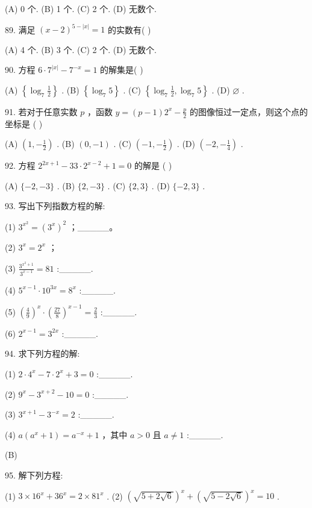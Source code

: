 \documentclass[10pt]{article}
\begin{document}
(A) 0 个. (B) 1 个. (C) 2 个. (D) 无数个.

89. 满足 \({\left( x - 2\right) }^{5 - \left| x\right| } = 1\) 的实数有( )

(A) 4 个. (B) 3 个. (C) 2 个. (D) 无数个.

90. 方程 \(6 \cdot  {7}^{\left| x\right| } - {7}^{-x} = 1\) 的解集是( )

(A) \(\left\{  {{\log }_{7}\frac{1}{2}}\right\}\) . (B) \(\left\{  {{\log }_{7}5}\right\}\) . (C) \(\left\{  {{\log }_{7}\frac{1}{2},{\log }_{7}5}\right\}\) . (D) \(\varnothing\) .

91. 若对于任意实数 \(p\) ，函数 \(y = \left( {p - 1}\right) {2}^{x} - \frac{p}{2}\) 的图像恒过一定点，则这个点的坐标是 ( )

(A) \(\left( {1, - \frac{1}{2}}\right)\) . (B) \(\left( {0, - 1}\right)\) . (C) \(\left( {-1, - \frac{1}{2}}\right)\) . (D) \(\left( {-2, - \frac{1}{4}}\right)\) .

92. 方程 \({2}^{{2x} + 1} - {33} \cdot  {2}^{x - 2} + 1 = 0\) 的解是 ( )

(A) \(\{  - 2, - 3\}\) . (B) \(\{ 2, - 3\}\) . (C) \(\{ 2,3\}\) . (D) \(\{  - 2,3\}\) .

93. 写出下列指数方程的解:

(1) \({3}^{{x}^{2}} = {\left( {3}^{x}\right) }^{2}\) ；\_\_\_\_\_。

(2) \({3}^{x} = {2}^{x}\) ；

(3) \(\frac{{3}^{{x}^{2} + 1}}{{3}^{x - 1}} = {81}\) :\_\_\_\_\_.

(4) \({5}^{x - 1} \cdot  {10}^{3x} = {8}^{x}\) :\_\_\_\_\_.

(5) \({\left( \frac{4}{9}\right) }^{x} \cdot  {\left( \frac{27}{8}\right) }^{x - 1} = \frac{2}{3}\) :\_\_\_\_\_.

(6) \({2}^{x - 1} = {3}^{2x}\) :\_\_\_\_\_.

94. 求下列方程的解:

(1) \(2 \cdot  {4}^{x} - 7 \cdot  {2}^{x} + 3 = 0\) :\_\_\_\_\_.

(2) \({9}^{x} - {3}^{x + 2} - {10} = 0\) :\_\_\_\_\_.

(3) \({3}^{x + 1} - {3}^{-x} = 2\) :\_\_\_\_\_.

(4) \(a\left( {{a}^{x} + 1}\right)  = {a}^{-x} + 1\) ，其中 \(a > 0\) 且 \(a \neq  1\) :\_\_\_\_\_.

(B)

95. 解下列方程:

(1) \(3 \times  {16}^{x} + {36}^{x} = 2 \times  {81}^{x}\) . (2) \({\left( \sqrt{5 + 2\sqrt{6}}\right) }^{x} + {\left( \sqrt{5 - 2\sqrt{6}}\right) }^{x} = {10}\) .
\end{document}

